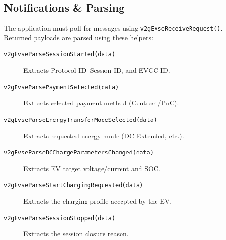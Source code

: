 \documentclass[a4paper,11pt]{report}
\begin{document}
\subsection{Notifications \& Parsing}
The application must poll for messages using \texttt{v2gEvseReceiveRequest()}. Returned payloads are parsed using these helpers:
\begin{description}
    \item[\texttt{v2gEvseParseSessionStarted(data)}] Extracts Protocol ID, Session ID, and EVCC-ID.
    \item[\texttt{v2gEvseParsePaymentSelected(data)}] Extracts selected payment method (Contract/PnC).
    \item[\texttt{v2gEvseParseEnergyTransferModeSelected(data)}] Extracts requested energy mode (DC Extended, etc.).
    \item[\texttt{v2gEvseParseDCChargeParametersChanged(data)}] Extracts EV target voltage/current and SOC.
    \item[\texttt{v2gEvseParseStartChargingRequested(data)}] Extracts the charging profile accepted by the EV.
    \item[\texttt{v2gEvseParseSessionStopped(data)}] Extracts the session closure reason.
\end{description}
\end{document}
